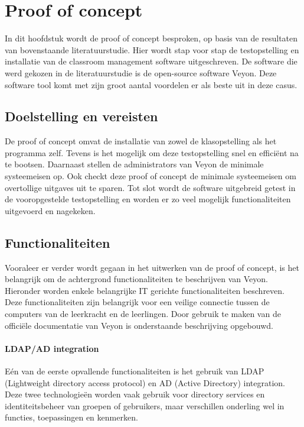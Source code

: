 \chapter{Proof of concept}
\label{ch:poc}


In dit hoofdstuk wordt de proof of concept besproken, op basis van de resultaten van bovenstaande literatuurstudie. Hier wordt stap voor stap de testopstelling en installatie van de classroom management software uitgeschreven. De software die werd gekozen in de literatuurstudie is de open-source software Veyon. Deze software tool komt met zijn groot aantal voordelen er als beste uit in deze casus. 

\section{Doelstelling en vereisten}
De proof of concept omvat de installatie van zowel de klasopstelling als het programma zelf. Tevens is het mogelijk om deze testopstelling snel en efficiënt na te bootsen. Daarnaast stellen de administrators van Veyon de minimale systeemeisen op. Ook checkt deze proof of concept de minimale systeemeisen om overtollige uitgaves uit te sparen. Tot slot wordt de software uitgebreid getest in de vooropgestelde testopstelling en worden er zo veel mogelijk functionaliteiten uitgevoerd en nagekeken.  

\section{Functionaliteiten}
Vooraleer er verder wordt gegaan in het uitwerken van de proof of concept, is het belangrijk om de achtergrond functionaliteiten te beschrijven van Veyon. Hieronder worden enkele belangrijke IT gerichte functionaliteiten beschreven. Deze functionaliteiten zijn belangrijk voor een veilige connectie tussen de computers van de leerkracht en de leerlingen. Door gebruik te maken van de officiële documentatie van Veyon \textcite{VeyonFunctionaliteiten} is onderstaande beschrijving opgebouwd.

\subsubsection{LDAP/AD integration}
Eén van de eerste opvallende functionaliteiten is het gebruik van LDAP (Lightweight directory access protocol) en AD (Active Directory) integration. Deze twee technologieën worden vaak gebruik voor directory services en identiteitsbeheer van groepen of gebruikers, maar verschillen onderling wel in functies, toepassingen en kenmerken. \newline
 
